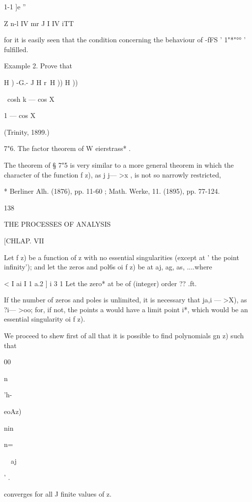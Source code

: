 1-1 ]e  '' 

Z n-l IV mr J I IV  iTT 



for it is easily seen that the condition concerning the behaviour of -fFS   '   1"*"°°  '  
fulfilled. 

Example 2. Prove that 

H )  -G.- J  H r\ H )) H )) 

\  cosh k — cos X 

1 — cos X 

(Trinity, 1899.) 

7"6. The factor theorem of W eierstrass* . 

The theorem of § 7"5 is very similar to a more general theorem in which 
the character of the function f z), as j   j— >x , is not so narrowly restricted, 

* Berliner Alh. (1876), pp. 11-60 ; Math. Werke, 11. (1895), pp. 77-124. 



138 



THE PROCESSES OF ANALYSIS 



[CHLAP. VII 



Let f z) be a function of z with no essential singularities (except at ' the 
point infinity'); and let the zeros and pol6s oi f z) be at aj, ag, as, ....where 

< I ai I   1 a.2 ]   i  3 1 Let the zero* at    be of (integer) order ?? .ft. 

If the number of zeros and poles is unlimited, it is necessary that 
ja,i — >X), as ?i— >oo; for, if not, the points a  would have a limit point i*, 
which would be an essential singularity oi f z). 

We proceed to shew first of all that it is possible to find polynomials 
gn z) such that 



00 

n 


'h-~\ 


eoAz) 


nin 


n=\ 


\ \  aj 




' . 



converges for all J finite values of z. 

